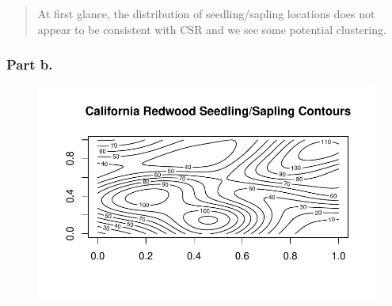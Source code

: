 \documentclass[
  letterpaper,
  DIV=11,
  numbers=noendperiod]{scrartcl}
\newenvironment{Shaded}{\begin{snugshade}}{\end{snugshade}}
\newcommand{\AttributeTok}[1]{\textcolor[rgb]{0.40,0.45,0.13}{#1}}
\newcommand{\DecValTok}[1]{\textcolor[rgb]{0.68,0.00,0.00}{#1}}
\newcommand{\FunctionTok}[1]{\textcolor[rgb]{0.28,0.35,0.67}{#1}}
\newcommand{\NormalTok}[1]{\textcolor[rgb]{0.00,0.23,0.31}{#1}}
\newcommand{\OtherTok}[1]{\textcolor[rgb]{0.00,0.23,0.31}{#1}}
\newcommand{\SpecialCharTok}[1]{\textcolor[rgb]{0.37,0.37,0.37}{#1}}
\newcommand{\StringTok}[1]{\textcolor[rgb]{0.13,0.47,0.30}{#1}}
\begin{document}
\begin{quote}
At first glance, the distribution of seedling/sapling locations does not
appear to be consistent with CSR and we see some potential clustering.
\end{quote}

\hypertarget{part-b.-1}{%
\subsubsection{Part b.}\label{part-b.-1}}

\begin{Shaded}
\end{Shaded}

\begin{figure}[H]

{\centering \includegraphics{robby_homework_2_files/figure-pdf/unnamed-chunk-6-1.pdf}

}

\end{figure}
\end{document}

